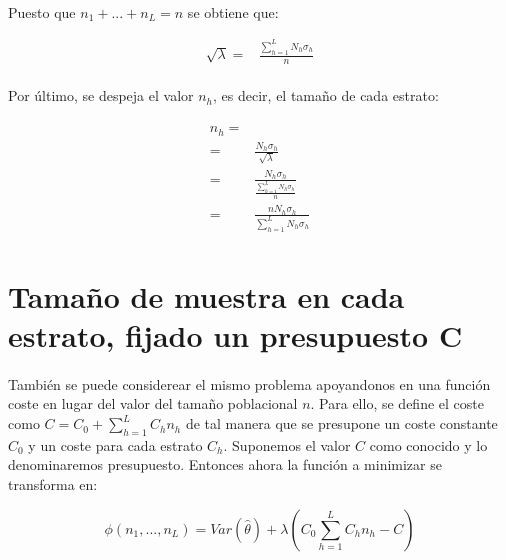 \documentclass{article}
\begin{document}
      \paragraph{}
      Puesto que $n_1 + ... + n_L = n$ se obtiene que:

      \begin{align}
        \sqrt{\lambda} =& \frac{\sum_{h=1}^L N_h \sigma_h }{n}
      \end{align}

      \paragraph{}
      Por último, se despeja el valor $n_h$, es decir, el tamaño de cada estrato:

      \begin{align}
        \begin{split}
          n_h =& \\
          =& \frac{N_h \sigma_h}{\sqrt{\lambda}}\\
          =& \frac{N_h \sigma_h}{\frac{\sum_{h=1}^L N_h \sigma_h }{n}}\\
          =& \frac{n N_h \sigma_h}{\sum_{h=1}^L N_h \sigma_h }
        \end{split}
      \end{align}

    \section{Tamaño de muestra en cada estrato, fijado un presupuesto C}
    \label{sec:dem_2}

      \paragraph{}
      También se puede considerear el mismo problema apoyandonos en una función coste en lugar del valor del tamaño poblacional $n$. Para ello, se define el coste como $C = C_0 + \sum_{h=1}^LC_hn_h$ de tal manera que se presupone un coste constante $C_0$ y un coste para cada estrato $C_h$. Suponemos el valor $C$ como conocido y lo denominaremos presupuesto. Entonces ahora la función a minimizar se transforma en:

      \begin{equation}
        \phi(n_1, ..., n_L) = Var(\widehat{\theta}) + \lambda \left( C_0 \sum_{h=1}^LC_hn_h - C\right)
      \end{equation}
\end{document}
